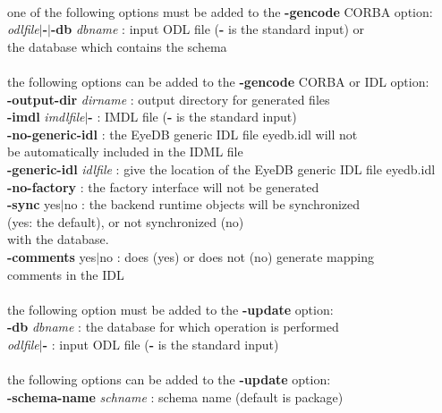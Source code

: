\begin{tabbing}
\\
one of the following options must be added to the {\bf -gencode} CORBA option:\\
\emph{odlfile}$|${\bf -$|$-db} \emph{dbname} \>: input ODL file ({\bf -} is the standard input) or\\
                             \>\>the database which contains the schema\\
\\
the following options can be added to the {\bf -gencode} CORBA or IDL option:\\
{\bf -output-dir} \emph{dirname}        \>: output directory for generated files\\
{\bf -imdl} \emph{imdlfile}$|${\bf -}           \>: IMDL file ({\bf -} is the standard input)\\
{\bf -no-generic-idl}              \>: the EyeDB generic IDL file eyedb.idl will not\\
                             \>\>  be automatically included in the IDML file\\
{\bf -generic-idl} \emph{idlfile}       \>: give the location of the EyeDB generic IDL file eyedb.idl\\
{\bf -no-factory}                  \>: the factory interface will not be generated\\
{\bf -sync} yes$|$no                 \>: the backend runtime objects will be synchronized\\
                             \>\>  (yes: the default), or not synchronized (no)\\
                             \>\>  with the database.\\
{\bf -comments} yes$|$no             \>: does (yes) or does not (no) generate mapping\\
                              \>\>comments in the IDL\\
\\
the following option must be added to the {\bf -update} option:\\
{\bf -db} \emph{dbname}                 \>: the database for which operation is performed\\
\emph{odlfile}$|${\bf -}                  \>: input ODL file ({\bf -} is the standard input)\\
\\
the following options can be added to the {\bf -update} option:\\
{\bf -schema-name} \emph{schname}       \>: schema name (default is package)\\

\end{tabbing}
